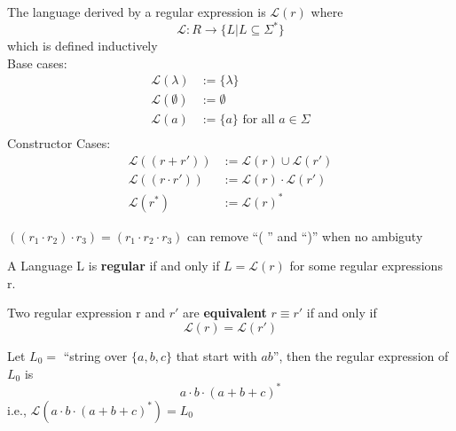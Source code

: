 \documentclass{aq-notes}
\begin{document}
    \begin{definition}
        The language derived by a regular expression is $\mathcal{L}(r)$ where 
        \[\mathcal{L}:R\to \{L|L\subseteq \Sigma^*\}\] which is defined inductively\\
        Base cases:
        \begin{align*}
            \mathcal{L}(\lambda) &:= \{\lambda\}\\
            \mathcal{L}(\emptyset) &:= \emptyset\\
            \mathcal{L}(a) &:= \{a\} \mbox{ for all } a \in \Sigma\\
        \end{align*}
        Constructor Cases:
        \begin{align*}
            \mathcal{L}((r+r')) &:= \mathcal{L}(r) \cup \mathcal{L}(r')\\
            \mathcal{L}((r\cdot r')) &:= \mathcal{L}(r)\cdot \mathcal{L}(r')\\
            \mathcal{L}(r^*) &:= \mathcal{L}(r)^*
        \end{align*}
        
    \end{definition}
    \begin{example}
        $((r_1\cdot r_2)\cdot r_3) = (r_1\cdot r_2\cdot r_3)$
        can remove ``( '' and ``)'' when no ambiguty
    \end{example}

    \begin{definition}
        A Language L is {\bf regular} if and only if $L=\mathcal{L}(r)$ for some regular expressions r.
    \end{definition}

    \begin{definition}
        Two regular expression r and $r'$ are {\bf equivalent} $r \equiv r'$ if and only if 
        \[\mathcal{L}(r) = \mathcal{L}(r')\]
    \end{definition}

    \begin{example}
        Let $L_0 = $ ``string over $\{a,b,c\}$ that start with $ab$'', then the regular expression of $L_0$ is
        \[a\cdot b\cdot (a+b+c)^*\]
        i.e., $\mathcal{L}(a\cdot b\cdot (a+b+c)^*) = L_0$
    \end{example}
\end{document}
